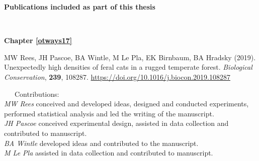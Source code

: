 \documentclass[11pt,a4paper,titlepage,twoside,openright]{style/unimelbthesis}
\begin{document}
\begin{frontmatter}
\begin{preface}
    \newpage

    \textbf{Publications included as part of this thesis}

    \(~\)

    \textbf{Chapter \ref{otways17}}

    MW Rees, JH Pascoe, BA Wintle, M Le Pla, EK Birnbaum, BA Hradsky (2019). Unexpectedly high densities of feral cats in a rugged temperate forest. \emph{Biological Conservation}, \textbf{239}, 108287. \url{https://doi.org/10.1016/j.biocon.2019.108287}

    ~~~Contributions:\\
    \hspace*{0.333em}\hspace*{0.333em}\hspace*{0.333em}\hspace*{0.333em}\hspace*{0.333em}\hspace*{0.333em}\hspace*{0.333em}\hspace*{0.333em}\emph{MW Rees} conceived and developed ideas, designed and conducted experiments, performed statistical analysis and led the writing of the manuscript.\\
    \hspace*{0.333em}\hspace*{0.333em}\hspace*{0.333em}\hspace*{0.333em}\hspace*{0.333em}\hspace*{0.333em}\hspace*{0.333em}\hspace*{0.333em}\emph{JH Pascoe} conceived experimental design, assisted in data collection and contributed to manuscript.\\
    \hspace*{0.333em}\hspace*{0.333em}\hspace*{0.333em}\hspace*{0.333em}\hspace*{0.333em}\hspace*{0.333em}\hspace*{0.333em}\hspace*{0.333em}\emph{BA Wintle} developed ideas and contributed to the manuscript.\\
    \hspace*{0.333em}\hspace*{0.333em}\hspace*{0.333em}\hspace*{0.333em}\hspace*{0.333em}\hspace*{0.333em}\hspace*{0.333em}\hspace*{0.333em}\emph{M Le Pla} assisted in data collection and contributed to manuscript.\\

\end{preface}
\end{frontmatter}
\end{document}
